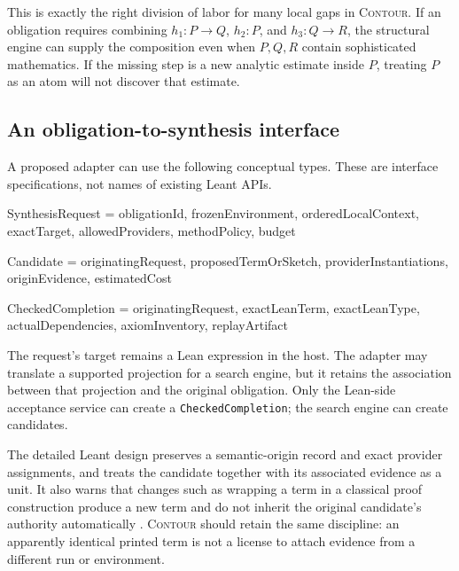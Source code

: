\documentclass[11pt,a4paper]{article}
\newcommand{\codeid}[1]{\nolinkurl{#1}}
\newcommand{\contour}{\textsc{Contour}}
\begin{document}
This is exactly the right division of labor for many local gaps in \contour{}. If an obligation requires combining $h_1:P\to Q$, $h_2:P$, and $h_3:Q\to R$, the structural engine can supply the composition even when $P,Q,R$ contain sophisticated mathematics. If the missing step is a new analytic estimate inside $P$, treating $P$ as an atom will not discover that estimate.

\subsection{An obligation-to-synthesis interface}

A proposed adapter can use the following conceptual types. These are interface specifications, not names of existing Leant APIs.

\par\noindent\begin{minipage}{\linewidth}
\begin{rawcode}
SynthesisRequest = {
  obligationId, frozenEnvironment, orderedLocalContext,
  exactTarget, allowedProviders, methodPolicy, budget
}

Candidate = {
  originatingRequest, proposedTermOrSketch,
  providerInstantiations, originEvidence, estimatedCost
}

CheckedCompletion = {
  originatingRequest, exactLeanTerm, exactLeanType,
  actualDependencies, axiomInventory, replayArtifact
}
\end{rawcode}
\end{minipage}\par

The request's target remains a Lean expression in the host. The adapter may translate a supported projection for a search engine, but it retains the association between that projection and the original obligation. Only the Lean-side acceptance service can create a \codeid{CheckedCompletion}; the search engine can create candidates.

The detailed Leant design preserves a semantic-origin record and exact provider assignments, and treats the candidate together with its associated evidence as a unit. It also warns that changes such as wrapping a term in a classical proof construction produce a new term and do not inherit the original candidate's authority automatically \cite{leantinternals}. \contour{} should retain the same discipline: an apparently identical printed term is not a license to attach evidence from a different run or environment.
\end{document}
